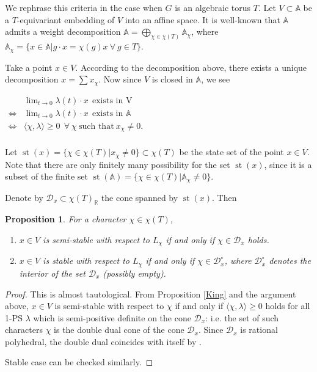 \documentclass[12pt,twoside]{amsart}
\newtheorem{prop}[theo]{Proposition}
\theoremstyle{definition}
\newcommand\st{\mathop{\mathrm{st}}}
\newcommand\br{\mathbb{R}}
\begin{document}
We rephrase this criteria in the case when $G$ is an algebraic torus $T$.
Let $V\subset \mathbb{A}$ be a $T$-equivariant embedding of $V$ into
an affine space.
It is well-known that $\mathbb{A}$ admits a weight decomposition
$\mathbb{A}=\bigoplus_{\chi\in\chi{(T)}}\mathbb{A}_{\chi}$, where
$\mathbb{A}_{\chi}=\{x\in\mathbb{A}|g\cdot x=\chi{(g)}x \ \forall \ g\in T\}$.

Take a point $x\in V$. According to the decomposition above,
there exists a unique decomposition $x=\sum x_{\chi}$. Now since $V$ is closed in $\mathbb{A}$,
we see

$\begin{array}{ll}
& \lim_{t\to 0}\lambda (t)\cdot x \ \ \textrm{exists in V} \\
\iff & \lim_{t\to 0}\lambda (t)\cdot x \ \ \textrm{exists in $\mathbb{A}$} \\
\iff & \langle \chi, \lambda\rangle\ge 0 \ \ \forall \ \chi \ \textrm{such that} \ x_{\chi}\not=0. \\
\end{array}$

Let $\st{(x)}=\{\chi\in\chi{(T)}|x_{\chi}\not=0\}\subset\chi{(T)}$ be the state set of the point $x\in V$.
Note that there are only finitely many possibility for the set $\st{(x)}$, since it is a subset of the
finite set $\st{(\mathbb{A})}=\{\chi\in\chi{(T)}|\mathbb{A}_{\chi}\not=0\}$.

Denote by $\mathcal{D}_x\subset\chi{(T)}_{\br}$ the cone spanned by $\st{(x)}$. Then
\begin{prop} For a character $\chi\in\chi{(T)}$, 
\begin{enumerate}
\item $x\in V$ is semi-stable with respect to $L_{\chi}$ if and only if
$\chi\in\mathcal{D}_x$ holds.

\item $x\in V$ is stable with respect to $L_{\chi}$ if and only if
$\chi\in\mathcal{D}_x^{\circ}$, where $\mathcal{D}_x^{\circ}$ denotes the interior
of the set $\mathcal{D}_x$ (possibly empty).
\end{enumerate}
\end{prop}

\begin{proof}
This is almost tautological. From Proposition \ref{King} and the argument above,
$x\in V$ is semi-stable with respect to $\chi$ if and only if $\langle \chi, \lambda\rangle\ge 0$
holds for all 1-PS $\lambda$ which is semi-positive definite on the cone $\mathcal{D}_{x}$:
i.e. the set of such characters $\chi$ is the double dual cone of the cone $\mathcal{D}_{x}$.
Since $\mathcal{D}_{x}$ is rational polyhedral, the double dual coincides with
itself by \cite[(1) on page 9]{f2}.

Stable case can be checked similarly.
\end{proof}
\end{document}
